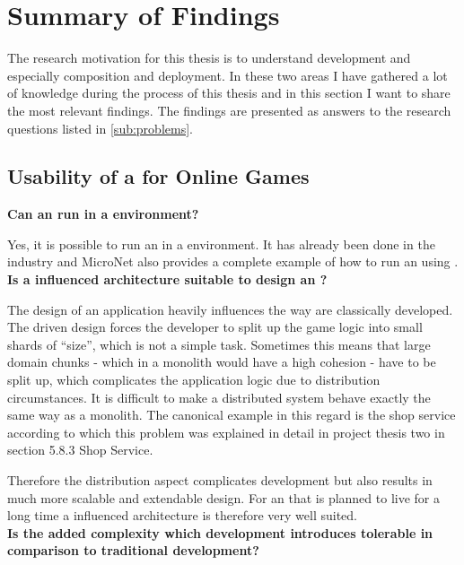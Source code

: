 \section{Summary of Findings}
\label{sub:summary_of_findings}

The research motivation for this thesis is to understand \ms{} development and
especially \ms{} composition and deployment. In these two areas I have gathered
a lot of knowledge during the process of this thesis and in this section I want
to share the most relevant findings. The findings are presented as
answers to the research questions listed in \autoref{sub:problems}.

\subsection{Usability of a \mss{} for Online Games}
\label{sub:usability_ms_og}

\noindent
\textbf{Can an \og{} run in a \ms{} environment?}

Yes, it is possible to run an \og{} in a \ms{} environment. It has already been
done in the industry \cite{pronschinske2015turbine} and MicroNet also
provides a complete example of how to run an \og{} using \mss{}.\\

\noindent
\textbf{Is a \ms{} influenced architecture suitable to design an \og{}?}

The design of an \og{} \ms{} application heavily influences the way \ogs{} are
classically developed. The \ms{} driven design forces the developer to split up
the game logic into small shards of \ms{} ``size'', which is not a simple task.
Sometimes this means that large domain chunks - which in a monolith would
have a high cohesion - have to be split up, which complicates the application
logic due to distribution circumstances. It is difficult to make a distributed system
behave exactly the same way as a monolith. The canonical example in this regard
is the shop service according to which this problem was explained in detail in
project thesis two \cite{biedermann2016project2} in section 5.8.3 Shop Service.

Therefore the distribution aspect complicates development but also results in
much more scalable and extendable design. For an \og{} that is planned to live
for a long time a \ms{} influenced architecture is therefore very well suited.\\

\noindent \textbf{ Is the added complexity which \ms{} development
introduces tolerable in comparison to traditional \og{} development?}

